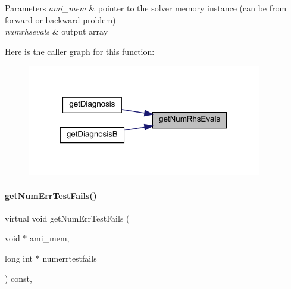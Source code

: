 \begin{DoxyParams}{Parameters}
{\em ami\+\_\+mem} & pointer to the solver memory instance (can be from forward or backward problem) \\
\hline
{\em numrhsevals} & output array \\
\hline
\end{DoxyParams}
Here is the caller graph for this function\+:
\nopagebreak
\begin{figure}[H]
\begin{center}
\leavevmode
\includegraphics[width=290pt]{classamici_1_1_solver_aaf8d4b1375cfa9e517ef0ec54e33d4d8_icgraph}
\end{center}
\end{figure}
\mbox{\label{classamici_1_1_solver_a605fc85e2d8183dca4ebe24f9d810516}} 
\paragraph{\texorpdfstring{getNumErrTestFails()}{getNumErrTestFails()}}
{\footnotesize\ttfamily virtual void get\+Num\+Err\+Test\+Fails (\begin{DoxyParamCaption}\item[{void $\ast$}]{ami\+\_\+mem,  }\item[{long int $\ast$}]{numerrtestfails }\end{DoxyParamCaption}) const\hspace{0.3cm}{\ttfamily [protected]}, {}}


